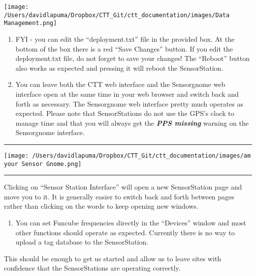 \documentclass[
]{article}
\providecommand{\tightlist}{%
  \setlength{\itemsep}{0pt}\setlength{\parskip}{0pt}}
\begin{document}
\texttt{[image: /Users/davidlapuma/Dropbox/CTT\_Git/ctt\_documentation/images/Data Management.png]}

\begin{enumerate}
\def\labelenumi{\arabic{enumi}.}
\setcounter{enumi}{11}
\item
  FYI - you can edit the ``deployment.txt'' file in the provided box. At
  the bottom of the box there is a red ``Save Changes'' button. If you
  edit the deployment.txt file, do not forget to save your changes! The
  ``Reboot'' button also works as expected and pressing it will reboot
  the SensorStation.
\item
  You can leave both the CTT web interface and the Sensorgnome web
  interface open at the same time in your web browser and switch back
  and forth as necessary. The Sensorgnome web interface pretty much
  operates as expected. Please note that SensorStations do not use the
  GPS's clock to manage time and that you will always get the
  \textbf{\emph{PPS missing}} warning on the Sensorgnome interface.
\end{enumerate}

\begin{center}\rule{0.5\linewidth}{0.5pt}\end{center}

\texttt{[image: /Users/davidlapuma/Dropbox/CTT\_Git/ctt\_documentation/images/am your Sensor Gnome.png]}

\begin{center}\rule{0.5\linewidth}{0.5pt}\end{center}

Clicking on ``Sensor Station Interface'' will open a new SensorStation
page and move you to it. It is generally easier to switch back and forth
between pages rather than clicking on the words to keep opening new
windows.

\begin{enumerate}
\def\labelenumi{\arabic{enumi}.}
\setcounter{enumi}{13}
\tightlist
\item
  You can set Funcube frequencies directly in the ``Devices'' window and
  most other functions should operate as expected. Currently there is no
  way to upload a tag database to the SensorStation.
\end{enumerate}

This should be enough to get us started and allow us to leave sites with
confidence that the SensorStations are operating correctly.
\end{document}
